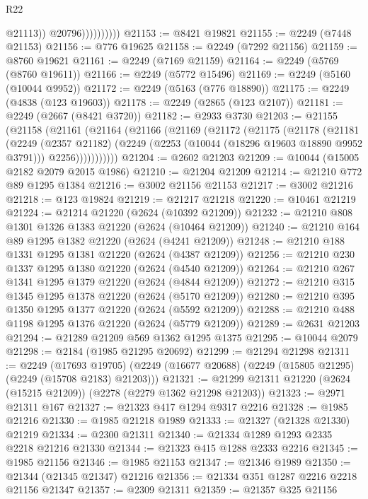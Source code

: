 \begin{lexlean}{R22}
\begin{coremodule}
                            @21113))
                        @20796))))))))))
@21153 := @8421 @19821
@21155 := @2249 (@7448 @21153)
@21156 := @776 @19625
@21158 := @2249 (@7292 @21156)
@21159 := @8760 @19621
@21161 := @2249 (@7169 @21159)
@21164 := @2249 (@5769 (@8760 @19611))
@21166 := @2249 (@5772 @15496)
@21169 := @2249 (@5160 (@10044 @9952))
@21172 := @2249 (@5163 (@776 @18890))
@21175 := @2249 (@4838 (@123 @19603))
@21178 := @2249 (@2865 (@123 @2107))
@21181 := @2249 (@2667 (@8421 @3720))
@21182 := @2933 @3730
@21203 := @21155
    (@21158
      (@21161
        (@21164
          (@21166
            (@21169
              (@21172
                (@21175
                  (@21178
                    (@21181
                      (@2249
                        (@2357 @21182)
                        (@2249 (@2253 (@10044 (@18296 @19603 @18890 @9952 @3791))) @2256)))))))))))
@21204 := @2602 @21203
@21209 := @10044 (@15005 @2182 @2079 @2015 @1986)
@21210 := @21204 @21209
@21214 := @21210 @772 @89 @1295 @1384
@21216 := @3002 @21156 @21153
@21217 := @3002 @21216
@21218 := @123 @19824
@21219 := @21217 @21218
@21220 := @10461 @21219
@21224 := @21214 @21220 (@2624 (@10392 @21209))
@21232 := @21210 @808 @1301 @1326 @1383 @21220 (@2624 (@10464 @21209))
@21240 := @21210 @164 @89 @1295 @1382 @21220 (@2624 (@4241 @21209))
@21248 := @21210 @188 @1331 @1295 @1381 @21220 (@2624 (@4387 @21209))
@21256 := @21210 @230 @1337 @1295 @1380 @21220 (@2624 (@4540 @21209))
@21264 := @21210 @267 @1341 @1295 @1379 @21220 (@2624 (@4844 @21209))
@21272 := @21210 @315 @1345 @1295 @1378 @21220 (@2624 (@5170 @21209))
@21280 := @21210 @395 @1350 @1295 @1377 @21220 (@2624 (@5592 @21209))
@21288 := @21210 @488 @1198 @1295 @1376 @21220 (@2624 (@5779 @21209))
@21289 := @2631 @21203
@21294 := @21289 @21209 @569 @1362 @1295 @1375
@21295 := @10044 @2079
@21298 := @2184 (@1985 @21295 @20692)
@21299 := @21294 @21298
@21311 := @2249
    (@17693 @19705)
    (@2249 (@16677 @20688) (@2249 (@15805 @21295) (@2249 (@15708 @2183) @21203)))
@21321 := @21299 @21311 @21220 (@2624 (@15215 @21209)) (@2278 (@2279 @1362 @21298 @21203))
@21323 := @2971 @21311 @167
@21327 := @21323 @417 @1294 @9317 @2216
@21328 := @1985 @21216
@21330 := @1985 @21218 @1989
@21333 := @21327 (@21328 @21330) @21219
@21334 := @2300 @21311
@21340 := @21334 @1289 @1293 @2335 @2218 @21216 @21330
@21344 := @21323 @415 @1288 @2333 @2216
@21345 := @1985 @21156
@21346 := @1985 @21153
@21347 := @21346 @1989
@21350 := @21344 (@21345 @21347) @21216
@21356 := @21334 @351 @1287 @2216 @2218 @21156 @21347
@21357 := @2309 @21311
@21359 := @21357 @325 @21156

\end{coremodule}
\end{lexlean}
